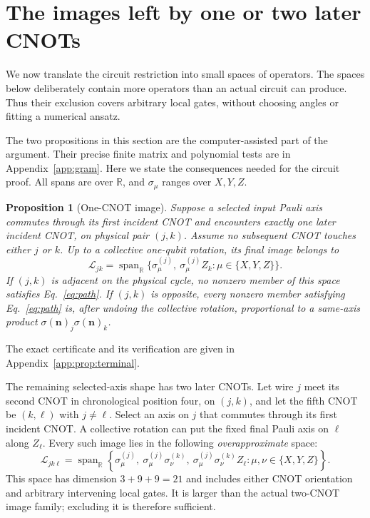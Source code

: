 \documentclass[11pt]{article}
\newtheorem{proposition}{Proposition}
\newcommand{\Span}{\operatorname{span}}
\begin{document}
\section{The images left by one or two later CNOTs}

We now translate the circuit restriction into small spaces of operators.
The spaces below deliberately contain more operators than an actual
circuit can produce. Thus their exclusion covers arbitrary local gates,
without choosing angles or fitting a numerical ansatz.

The two propositions in this section are the computer-assisted part of
the argument. Their precise finite matrix and polynomial tests are in
Appendix~\ref{app:gram}. Here we state the consequences needed for the
circuit proof. All spans are over $\mathbb R$, and $\sigma_\mu$ ranges
over $X,Y,Z$.

\begin{proposition}[One-CNOT image]\label{prop:terminal}
Suppose a selected input Pauli axis commutes through its first incident
CNOT and encounters exactly one later incident CNOT, on physical pair $(j,k)$.
Assume no subsequent CNOT touches either $j$ or $k$. Up to a collective one-qubit rotation, its final image belongs to
\begin{equation}\label{eq:pair-space}
\mathcal L_{jk}=\Span_{\mathbb R}
 \{\sigma_\mu^{(j)},\ \sigma_\mu^{(j)}Z_k:
   \mu\in\{X,Y,Z\}\}.
\end{equation}
If $(j,k)$ is adjacent on the physical cycle, no nonzero member of this
space satisfies Eq.~\eqref{eq:path}.  If $(j,k)$ is opposite, every
nonzero member satisfying Eq.~\eqref{eq:path} is, after undoing the
collective rotation, proportional to a same-axis product
$\sigma(\mathbf n)_j\sigma(\mathbf n)_k$.
\end{proposition}

\noindent The exact certificate and its verification are given in Appendix~\ref{app:prop:terminal}.

The remaining selected-axis shape has two later CNOTs.  Let wire $j$
meet its second CNOT in chronological position four, on $(j,k)$, and
let the fifth CNOT be $(k,\ell)$ with $j\ne\ell$.  Select an axis on $j$
that commutes through its first incident CNOT.  A collective rotation
can put the fixed final Pauli axis on $\ell$ along $Z_\ell$.  Every such
image lies in the following \emph{overapproximate} space:
\begin{equation}\label{eq:chain-space}
\mathcal L_{jk\ell}=\Span_{\mathbb R}
 \left\{\sigma_\mu^{(j)},\
 \sigma_\mu^{(j)}\sigma_\nu^{(k)},\
 \sigma_\mu^{(j)}\sigma_\nu^{(k)} Z_\ell:
 \mu,\nu\in\{X,Y,Z\}\right\}.
\end{equation}
This space has dimension $3+9+9=21$ and includes either CNOT
orientation and arbitrary intervening local gates.  It is larger than
the actual two-CNOT image family; excluding it is therefore sufficient.
\end{document}
